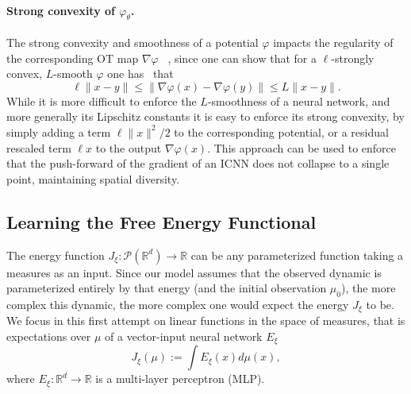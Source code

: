 \paragraph{Strong convexity of $\varphi_\theta$.} The strong convexity and smoothness of a potential $\varphi$ impacts the regularity of the corresponding OT map $\nabla\varphi$ ~\citep{caffarelli2000monotonicity,figalli2010optimal}, since one can show that for a $\ell$-strongly convex, $L$-smooth $\varphi$ one has~\citep{paty2020regularity} that
$$
\ell \|x - y\| \leq \|\nabla\varphi(x) -\nabla\varphi(y)\|  \leq L\|x - y\|.
$$
While it is more difficult to enforce the $L$-smoothness of a neural network, and more generally its Lipschitz constants \citep{scaman2018lipschitz} it is easy to enforce its strong convexity, by simply adding a term $\ell \|x\|^2/2$ to the corresponding potential, or a residual rescaled term $\ell x$ to the output $\nabla\varphi(x)$. This approach can be used to enforce that the push-forward of the gradient of an ICNN does not collapse to a single point, maintaining spatial diversity.

\subsection{Learning the Free Energy Functional}  \label{sec:learn_energy}
The energy function $J_\xi : \mathcal{P}(\mathbb{R}^d) \rightarrow \mathbb{R}$ can be any parameterized function taking a measures as an input. 
Since our model assumes that the observed dynamic is parameterized entirely by that energy (and the initial observation $\mu_0$), the more complex this dynamic, the more complex one would expect the energy $J_\xi$ to be. We focus in this first attempt on linear functions in the space of measures, that is expectations over $\mu$ of a vector-input neural network $E_\xi$
\begin{equation} \label{eq:energy}
    J_\xi(\mu) := \int E_\xi(x) d\mu(x),
\end{equation}
where $E_\xi:\mathbb{R}^d \rightarrow \mathbb{R}$ is a multi-layer perceptron (MLP).


